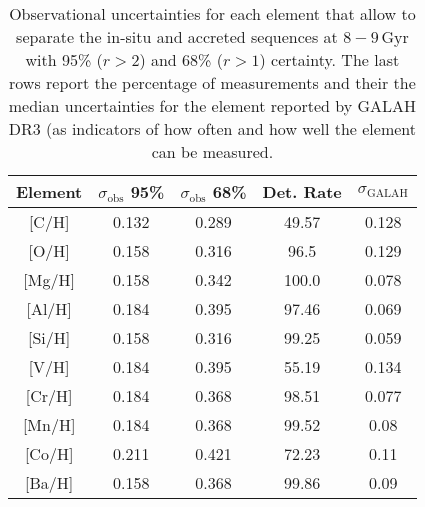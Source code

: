 \begin{table}
    \centering
    \caption{Observational uncertainties for each element that allow to separate the in-situ and accreted sequences at $8-9\,\mathrm{Gyr}$ with 95\% ($r>2$) and 68\% ($r>1$) certainty. The last rows report the percentage of measurements and their the median uncertainties for the element reported by GALAH DR3 (as indicators of how often and how well the element can be measured.}
    \begin{tabular}{ccccc}
    \hline
    Element & $\sigma_\text{obs}$ 95\% & $\sigma_\text{obs}$ 68\% & Det. Rate & $\sigma_\text{GALAH}$ \\
    \hline \hline
    {[C/H]}  & 0.132 & 0.289 & 49.57 & 0.128 \\
    {[O/H]}  & 0.158 & 0.316 & 96.5 & 0.129 \\
    {[Mg/H]}  & 0.158 & 0.342 & 100.0 & 0.078 \\
    {[Al/H]}  & 0.184 & 0.395 & 97.46 & 0.069 \\
    {[Si/H]}  & 0.158 & 0.316 & 99.25 & 0.059 \\
    {[V/H]}  & 0.184 & 0.395 & 55.19 & 0.134 \\
    {[Cr/H]}  & 0.184 & 0.368 & 98.51 & 0.077 \\
    {[Mn/H]}  & 0.184 & 0.368 & 99.52 & 0.08 \\
    {[Co/H]}  & 0.211 & 0.421 & 72.23 & 0.11 \\
    {[Ba/H]}  & 0.158 & 0.368 & 99.86 & 0.09 \\
    \hline
    \end{tabular}
    \label{tab:r_values_simulation}
\end{table}
